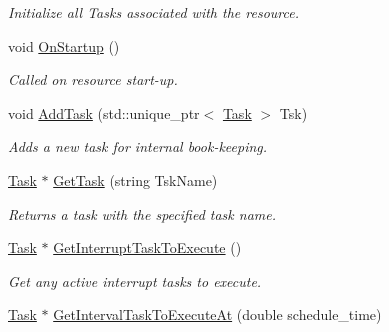 \begin{DoxyCompactItemize}
\begin{DoxyCompactList}\small\item\em Initialize all Tasks associated with the resource. \end{DoxyCompactList}\item 
void \hyperlink{classpc__emulator_1_1PCResourceImpl_a7ec61ad207d5fc8a2442a35cd35b7bc1}{On\+Startup} ()\hypertarget{classpc__emulator_1_1PCResourceImpl_a7ec61ad207d5fc8a2442a35cd35b7bc1}{}\label{classpc__emulator_1_1PCResourceImpl_a7ec61ad207d5fc8a2442a35cd35b7bc1}

\begin{DoxyCompactList}\small\item\em Called on resource start-\/up. \end{DoxyCompactList}\item 
void \hyperlink{classpc__emulator_1_1PCResourceImpl_a3743fcd2d5c0b2f751d39ca0054f57dd}{Add\+Task} (std\+::unique\+\_\+ptr$<$ \hyperlink{classpc__emulator_1_1Task}{Task} $>$ Tsk)\hypertarget{classpc__emulator_1_1PCResourceImpl_a3743fcd2d5c0b2f751d39ca0054f57dd}{}\label{classpc__emulator_1_1PCResourceImpl_a3743fcd2d5c0b2f751d39ca0054f57dd}

\begin{DoxyCompactList}\small\item\em Adds a new task for internal book-\/keeping. \end{DoxyCompactList}\item 
\hyperlink{classpc__emulator_1_1Task}{Task} $\ast$ \hyperlink{classpc__emulator_1_1PCResourceImpl_ac38ed16e35f2fc781c23f043b3c9a5d6}{Get\+Task} (string Tsk\+Name)\hypertarget{classpc__emulator_1_1PCResourceImpl_ac38ed16e35f2fc781c23f043b3c9a5d6}{}\label{classpc__emulator_1_1PCResourceImpl_ac38ed16e35f2fc781c23f043b3c9a5d6}

\begin{DoxyCompactList}\small\item\em Returns a task with the specified task name. \end{DoxyCompactList}\item 
\hyperlink{classpc__emulator_1_1Task}{Task} $\ast$ \hyperlink{classpc__emulator_1_1PCResourceImpl_ab10ac448c65a1d4548f047c3fdf9c91e}{Get\+Interrupt\+Task\+To\+Execute} ()\hypertarget{classpc__emulator_1_1PCResourceImpl_ab10ac448c65a1d4548f047c3fdf9c91e}{}\label{classpc__emulator_1_1PCResourceImpl_ab10ac448c65a1d4548f047c3fdf9c91e}

\begin{DoxyCompactList}\small\item\em Get any active interrupt tasks to execute. \end{DoxyCompactList}\item 
\hyperlink{classpc__emulator_1_1Task}{Task} $\ast$ \hyperlink{classpc__emulator_1_1PCResourceImpl_a72898a5dd446e142f7e5cea6ce469486}{Get\+Interval\+Task\+To\+Execute\+At} (double schedule\+\_\+time)\hypertarget{classpc__emulator_1_1PCResourceImpl_a72898a5dd446e142f7e5cea6ce469486}{}\label{classpc__emulator_1_1PCResourceImpl_a72898a5dd446e142f7e5cea6ce469486}


\end{DoxyCompactItemize}
